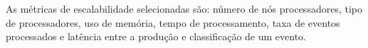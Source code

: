 



As métricas de escalabilidade selecionadas são: número de nós processadores,
tipo de processadores, uso de memória, tempo de processamento, taxa de eventos
processados e latência entre a produção e classificação de um evento.



